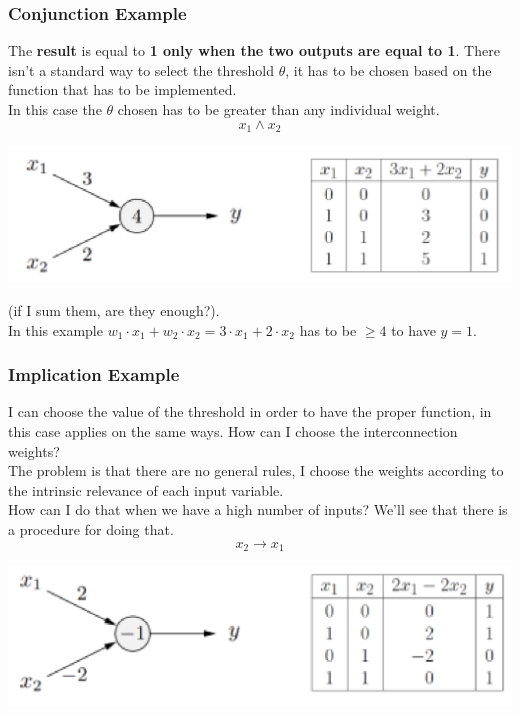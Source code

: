 \newpage

\subsubsection{Conjunction Example}
The \textbf{result} is equal to \textbf{1 only when the two outputs are equal to 1}. There isn't a standard way to select the threshold $\theta$, it has to be chosen based on the function that has to be implemented. \\

In this case the $\theta$ chosen has to be greater than any individual weight.
$$ x_1 \wedge x_2 $$
\begin{center}
	\includegraphics[width=0.85\columnwidth]{img/NN/TLU2}
\end{center}
(if I sum them, are they enough?).\\

In this example $w_1 \cdot x_1 + w_2 \cdot x_2 = 3 \cdot x_1 + 2 \cdot x_2$ has to be $\geq 4$ to have $y=1$.\\

\newpage

\subsubsection{Implication Example}
I can choose the value of the threshold in order to have the proper function, in this case applies on the same ways. How can I choose the interconnection weights? \\

The problem is that there are no general rules, I choose the weights according to the intrinsic relevance of each input variable.\\

How can I do that when we have a high number of inputs? We'll see that there is a procedure for doing that.
$$ x_2 \rightarrow x_1 $$
\begin{center}
	\includegraphics[width=0.85\columnwidth]{img/NN/TLU3}
\end{center}

